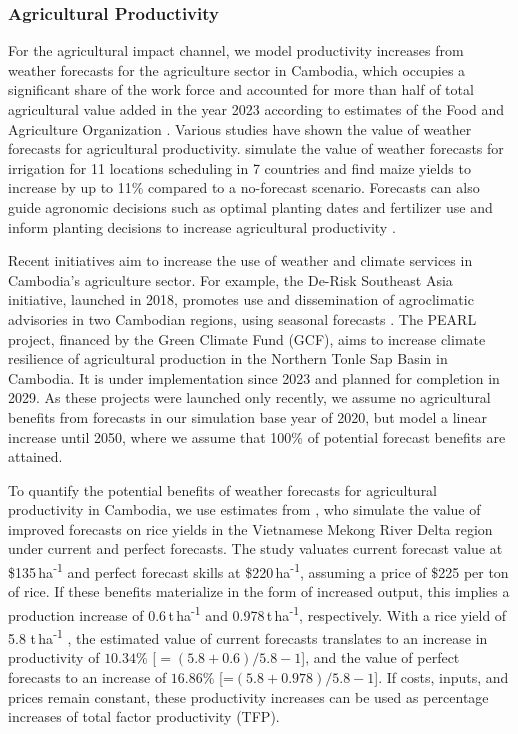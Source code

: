 \documentclass[
  final,
  10pt,
  letterpaper,
  english,
]{article}
\begin{document}
\subsubsection{Agricultural Productivity}
\label{sec:methods_agriculture}
For the agricultural impact channel, we model productivity increases from
weather forecasts for the agriculture sector in Cambodia, which occupies a
significant share of the work force \parencite{WorldBank2013CambodiaHydroMet}
and accounted for more than half of total agricultural value added in the year
2023 according to estimates of the Food and Agriculture Organization
\parencite{fao_faostat_2025}. Various studies have shown the value of weather
forecasts for agricultural productivity. \cite{collins_evaluating_2024} simulate
the value of weather forecasts for irrigation for 11 locations scheduling in 7
countries and find maize yields to increase by up to 11\% compared to a
no-forecast scenario. Forecasts can also guide agronomic decisions such as
optimal planting dates and fertilizer use \parencite{hansen_potential_2009} and
inform planting decisions to increase agricultural productivity
\parencite{tarchiani_access_2021}. 

Recent initiatives aim to increase the use of weather and climate services in
Cambodia's agriculture sector. For example, the De-Risk Southeast Asia
initiative, launched in 2018, promotes use and dissemination of agroclimatic
advisories in two Cambodian regions, using seasonal forecasts
\parencite{swaans2023agroadvisories}. The PEARL project, financed by the Green
Climate Fund (GCF), aims to increase climate resilience of agricultural
production in the Northern Tonle Sap Basin in Cambodia. It is under
implementation since 2023 and planned for completion in 2029. As these projects
were launched only recently, we assume no agricultural benefits from forecasts
in our simulation base year of 2020, but model a linear increase until 2050,
where we assume that 100\% of potential forecast benefits are attained.

To quantify the potential benefits of weather forecasts for agricultural
productivity in Cambodia, we use estimates from \cite{an-vo_framework_2021}, who
simulate the value of improved forecasts on rice yields in the Vietnamese Mekong
River Delta region under current and perfect forecasts. The study valuates
current forecast value at \$135\,ha\textsuperscript{-1} and perfect forecast
skills at \$220\,ha\textsuperscript{-1}, assuming a price of \$225 per ton of
rice. If these benefits materialize in the form of increased output, this
implies a production increase of 0.6\,t\,ha\textsuperscript{-1} and
0.978\,t\,ha\textsuperscript{-1}, respectively. With a rice yield of 5.8
t\,ha\textsuperscript{-1} \parencite{stuart2018farm}, the estimated value of
current forecasts translates to an increase in productivity of $10.34\%$ [$=(5.8
+ 0.6) / 5.8 - 1$], and the value of perfect forecasts to an increase of
$16.86\%$ [=$(5.8 + 0.978) / 5.8 - 1$]. If costs, inputs, and prices remain
constant, these productivity increases can be used as percentage increases of
total factor productivity (TFP). 
\end{document}

